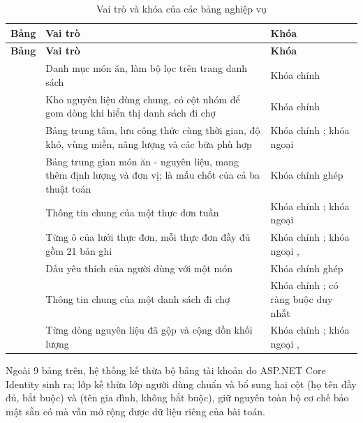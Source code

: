 \begin{longtable}{|P{4.5cm}|P{5.2cm}|P{3.7cm}|}
\caption{Vai trò và khóa của các bảng nghiệp vụ}
\label{tab:tom-tat-bang}\\
\hline
\bfseries Bảng & \bfseries Vai trò & \bfseries Khóa \\ \hline
\endfirsthead
\hline
\bfseries Bảng & \bfseries Vai trò & \bfseries Khóa \\ \hline
\endhead
\endfoot
{} & Danh mục món ăn, làm bộ lọc trên trang danh sách &
  Khóa chính  \\ \hline
{} & Kho nguyên liệu dùng chung, có cột nhóm để gom dòng khi
  hiển thị danh sách đi chợ & Khóa chính  \\ \hline
{} & Bảng trung tâm, lưu công thức cùng thời gian, độ khó, vùng
  miền, năng lượng và các bữa phù hợp & Khóa chính ; khóa ngoại
   \\ \hline
{} & Bảng trung gian món ăn - nguyên liệu, mang thêm định
  lượng và đơn vị; là mấu chốt của cả ba thuật toán & Khóa chính ghép
   \\ \hline
{} & Thông tin chung của một thực đơn tuần & Khóa chính ;
  khóa ngoại  \\ \hline
{} & Từng ô của lưới thực đơn, mỗi thực đơn đầy đủ gồm 21 bản
  ghi & Khóa chính ; khóa ngoại ,  \\ \hline
{} & Dấu yêu thích của người dùng với một món & Khóa chính ghép
   \\ \hline
{} & Thông tin chung của một danh sách đi chợ &
  Khóa chính ;  có ràng buộc duy nhất \\ \hline
{} & Từng dòng nguyên liệu đã gộp và cộng dồn khối lượng &
  Khóa chính ; khóa ngoại ,
   \\ \hline
\end{longtable}

Ngoài 9 bảng trên, hệ thống kế thừa bộ bảng tài khoản do ASP.NET Core Identity
sinh ra; lớp  kế thừa lớp người dùng chuẩn và bổ sung hai
cột  (họ tên đầy đủ, bắt buộc) và  (tên gia
đình, không bắt buộc), giữ nguyên toàn bộ cơ chế bảo mật sẵn có mà vẫn mở rộng
được dữ liệu riêng của bài toán.

